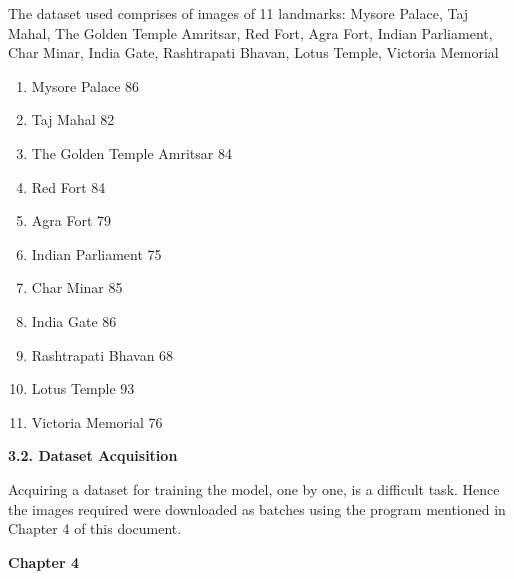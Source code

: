\documentclass[10pt]{article} %
\begin{document}
\begin{spacing}{1.5}
\noindent The dataset used comprises of images of 11 landmarks: Mysore Palace, Taj Mahal, The Golden Temple Amritsar, Red Fort, Agra Fort, Indian Parliament, Char Minar, India Gate, Rashtrapati Bhavan, Lotus Temple, Victoria Memorial

\noindent 

\noindent \begin{enumerate}
\item Mysore Palace 86~

\noindent \item Taj Mahal 82~

\noindent \item The Golden Temple Amritsar 84~

\noindent \item Red Fort 84~

\noindent \item Agra Fort 79~

\noindent \item Indian Parliament 75~

\noindent \item Char Minar 85~

\noindent \item India Gate 86~

\noindent \item Rashtrapati Bhavan 68~

\noindent \item Lotus Temple 93~

\noindent \item Victoria Memorial 76
\end{enumerate}

\noindent 

\noindent \textbf{3.2. Dataset Acquisition}
\vspace{2mm}
\noindent \textbf{}

\noindent \textbf{}

\noindent Acquiring a dataset for training the model, one by one, is a difficult task. Hence the images required were downloaded as batches using the program mentioned in Chapter 4 of this document.\textbf{}
\end{spacing}
\newpage





\begin{Center}

\noindent \textbf{\Large Chapter 4}

\end{Center}
\end{document}
